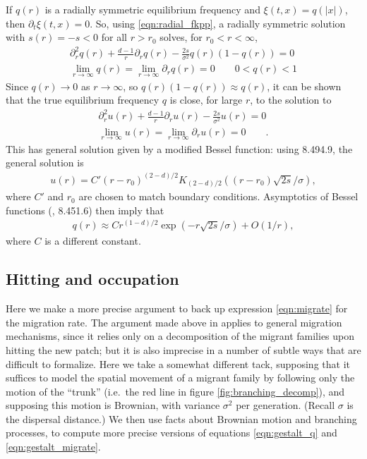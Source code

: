\documentclass{article}
\newcommand{\citet}[1]{\cite{#1}}
\begin{document}
If $q(r)$ is a radially symmetric equilibrium frequency and $\xi(t,x)=q(|x|)$,
then $\partial_t \xi(t,x) = 0$.
So, using \eqref{eqn:radial_fkpp}, a radially symmetric solution 
with $s(r) = -s < 0$ for all $r>r_0$ 
solves, for $r_0 < r < \infty$,
\begin{align} \label{eqn:radial_eqfreq_diffeq}
    \partial_r^2 q(r) + \frac{d-1}{r} \partial_r q(r) - \frac{2s}{\sigma^2} q(r) (1-q(r)) = 0 \\
    \lim_{r \to \infty} q(r) = \lim_{r \to \infty} \partial_r q(r) = 0 \qquad 
    0 < q(r) < 1 
\end{align}
Since $q(r) \to 0$ as $r \to \infty$, so $q(r) (1-q(r)) \approx q(r)$,
it can be shown 
that the true equilibrium frequency $q$ is close, for large $r$, to the solution to
\begin{align}
    \partial_r^2 u(r) + \frac{d-1}{r} \partial_r u(r) - \frac{2s}{\sigma^2} u(r) = 0  \label{eqn:bessel} \\
    \lim_{r \to \infty} u(r) = \lim_{r \to \infty} \partial_r u(r) = 0 \qquad  .
\end{align}
This has general solution given by a modified Bessel function:
using \citet{gradshteyn2007table} 8.494.9,
the general solution is
\begin{align}
    u(r) = C' (r-r_0)^{(2-d)/2} K_{(2-d)/2} \left( (r-r_0) \sqrt{2s}/\sigma \right) ,
\end{align}
where $C'$ and $r_0$ are chosen to match boundary conditions.
Asymptotics of Bessel functions (\citet{gradshteyn2007table}, 8.451.6) then imply that
\begin{align}
    q(r) \approx C r^{(1-d)/2} \exp \left( -r \sqrt{2s}/\sigma \right) + O(1/r),
\end{align}
where $C$ is a different constant.



\subsection[Hitting and Occupation]{Hitting and occupation}
\label{ss:hitting_occupation}

Here we make a more precise argument to back up expression \eqref{eqn:migrate} for the migration rate.
The argument made above in  applies to general migration mechanisms,
since it relies only on a decomposition of the migrant families upon hitting the new patch;
but it is also imprecise in a number of subtle ways
that are difficult to formalize.
Here we take a somewhat different tack,
supposing that it suffices to model the spatial movement of a migrant family
by following only the motion of the ``trunk''
(i.e.\ the red line in figure \ref{fig:branching_decomp}),
and supposing this motion is Brownian, with variance $\sigma^2$ per generation.
(Recall $\sigma$ is the dispersal distance.)
We then use facts about Brownian motion and branching processes, 
to compute more precise versions of equations \eqref{eqn:gestalt_q} and \eqref{eqn:gestalt_migrate}.
\end{document}

